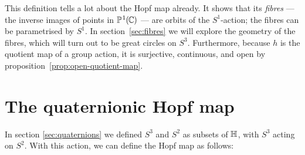 This definition tells a lot about the Hopf map already.
It shows that its \emph{fibres} — the inverse images of points in $\mathbb{P}^{\hspace{0.8pt}1}\hspace{-0.3pt}(\hspace{-0.7pt}\mathbb{C}\hspace{-0.3pt})$ —
are orbits of the $S^1$-action;
the fibres can be parametrised by $S^1\!$.
In section~\ref{sec:fibres} we will explore the geometry of the fibres,
which will turn out to be great circles on $S^3\!$.
Furthermore,
because $h$ is the quotient map of a group action,
it is surjective, continuous, and open by proposition~\ref{prop:open-quotient-map}.

\section{The quaternionic Hopf map}
\label{sec:hopf-quaternionic}
In section \ref{sec:quaternions} we defined $S^3$ and $S^2$ as subsets of $\mathbb{H}$,
with $S^3$ acting on $S^2\!$.
With this action,
we can define the Hopf map as follows:

